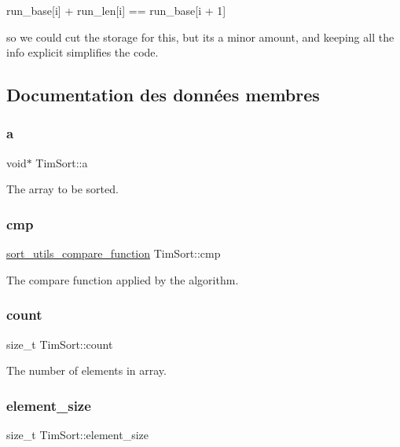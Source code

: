run\+\_\+base\mbox{[}i\mbox{]} + run\+\_\+len\mbox{[}i\mbox{]} == run\+\_\+base\mbox{[}i + 1\mbox{]}

so we could cut the storage for this, but it\textquotesingle{}s a minor amount, and keeping all the info explicit simplifies the code. 

\subsection{Documentation des données membres}
\mbox{\label{struct_tim_sort_ae06e936999af8a0b9e865016ea5cdc5e}} 
\subsubsection{\texorpdfstring{a}{a}}
{\footnotesize\ttfamily void$\ast$ Tim\+Sort\+::a}

The array to be sorted. \mbox{\label{struct_tim_sort_a695f16b718861286692c213382c246f1}} 
\subsubsection{\texorpdfstring{cmp}{cmp}}
{\footnotesize\ttfamily \mbox{\hyperlink{sort__utils_8h_a9cf5dbf2659d97b36bb0065d92103647}{sort\+\_\+utils\+\_\+compare\+\_\+function}} Tim\+Sort\+::cmp}

The compare function applied by the algorithm. \mbox{\label{struct_tim_sort_ae858cf5f25b0a6efaebaac1b307ab1d9}} 
\subsubsection{\texorpdfstring{count}{count}}
{\footnotesize\ttfamily size\+\_\+t Tim\+Sort\+::count}

The number of elements in array. \mbox{\label{struct_tim_sort_a153513d2ef446b6ccd7080f6d1ba7072}} 
\subsubsection{\texorpdfstring{element\_size}{element\_size}}
{\footnotesize\ttfamily size\+\_\+t Tim\+Sort\+::element\+\_\+size}

